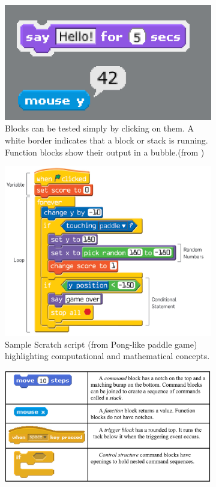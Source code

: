 \documentclass[runningheads,a4paper]{llncs}
\begin{document}
\begin{figure}[ht]
\centering
\begin{subfigure}[t]{0.45\textwidth}\centering\includegraphics[width=0.9\columnwidth]{images/ScratchLive.png}
\caption{Blocks can be tested simply by clicking on them. A white border indicates that a block or 
stack is running. Function blocks show their output in a  bubble.(from \cite{maloney2010scratch})}\label{subfig:blocktest}\end{subfigure}
\hspace*{\fill}
\begin{subfigure}[t]{0.45\textwidth}\centering\includegraphics[width=0.9\columnwidth]{images/Snatch1.PNG}
\caption{Sample Scratch script (from Pong-like paddle game) highlighting computational and mathematical concepts.}\label{subfig:highlightconcepts}\end{subfigure}
\begin{subfigure}[t]{0.9\textwidth}\vspace{1cm}\centering\includegraphics[width=0.9\columnwidth]{images/ScratchBlockTypes.PNG}

\end{subfigure}
\end{figure}
\end{document}
